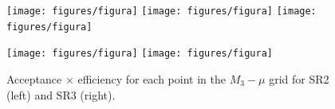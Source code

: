 \begin{figure}[hb!]
  \centering
  \texttt{[image: figures/figura]} %
  \texttt{[image: figures/figura]} %
  \texttt{[image: figures/figura]} %
  \label{fig:opt_exp_significance}
\end{figure}




\begin{figure}[h!]
  \centering
  \texttt{[image: figures/figura]} %
  \texttt{[image: figures/figura]} %
  \caption{Acceptance $\times$ efficiency for each point in the $M_3-\mu$ grid for SR2 (left) and SR3 (right).}
  \label{fig:efficiency}
\end{figure}
